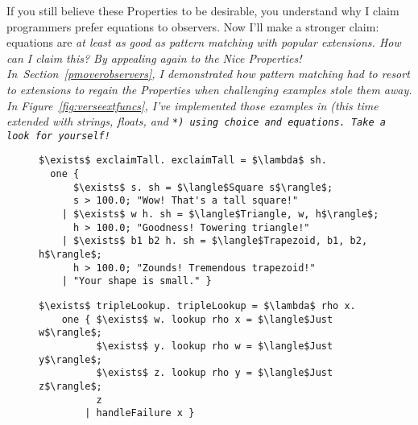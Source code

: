\documentclass[manuscript,screen,review, 12pt, nonacm]{acmart}
\begin{document}
    If you still believe these Properties to be desirable, you understand why I
    claim programmers prefer equations to observers. Now I'll make a stronger
    claim: equations are \it{at least as good as} pattern matching with popular
    extensions. How can I claim this? By appealing again to the Nice Properties!
    In~Section~\ref{pmoverobservers}, I demonstrated how pattern matching had to
    resort to extensions to regain the Properties when challenging examples
    stole them away. In Figure~\ref{fig:verseextfuncs}, I've implemented those
    examples in \VC (this time extended with strings, floats, and \tt{*}) using
    choice and equations. Take a look for yourself! 

    \begin{figure}[ht] 
        \begin{minipage}[h]{0.54\linewidth}
          \verselst
          \begin{lstlisting}[numbers=none, basicstyle=\tiny, xleftmargin=.2em,
                            showstringspaces=false,
                            frame=single]
$\exists$ exclaimTall. exclaimTall = $\lambda$ sh. 
  one { 
      $\exists$ s. sh = $\langle$Square s$\rangle$; 
      s > 100.0; "Wow! That's a tall square!"
    | $\exists$ w h. sh = $\langle$Triangle, w, h$\rangle$; 
      h > 100.0; "Goodness! Towering triangle!"
    | $\exists$ b1 b2 h. sh = $\langle$Trapezoid, b1, b2, h$\rangle$;
      h > 100.0; "Zounds! Tremendous trapezoid!"
    | "Your shape is small." }
            \end{lstlisting}
            \label{fig:verseexclaimtall} 
        \end{minipage}%
        \begin{minipage}[h]{0.5\linewidth}
          \verselst
          \begin{lstlisting}[numbers=none, basicstyle=\tiny, xleftmargin=2em,
                        frame=single]
$\exists$ tripleLookup. tripleLookup = $\lambda$ rho x. 
    one { $\exists$ w. lookup rho x = $\langle$Just w$\rangle$; 
          $\exists$ y. lookup rho w = $\langle$Just y$\rangle$; 
          $\exists$ z. lookup rho y = $\langle$Just z$\rangle$;
          z
        | handleFailure x }
          \end{lstlisting}
            \label{fig:versetriplelookup} 

\end{minipage}
\end{figure}
\end{document}
